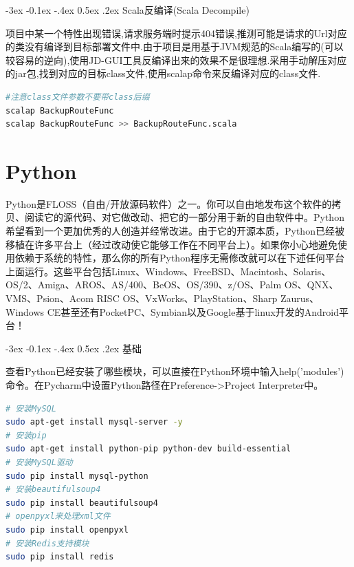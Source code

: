 \documentclass[12pt]{book}
\makeatletter
\numberwithin{dummy}{section}
\theoremstyle{ocrenumbox}
\theoremstyle{blacknumex}
\theoremstyle{blacknumbox}
\theoremstyle{ocrenum}
\renewcommand{\subsection}{\@startsection {subsection}{2}{\z@}
	{-3ex \@plus -0.1ex \@minus -.4ex}
	{0.5ex \@plus.2ex }
	{\normalfont\sffamily\bfseries}}
\makeatother
\begin{document}
\subsection{Scala反编译(Scala Decompile)}

项目中某一个特性出现错误,请求服务端时提示404错误,推测可能是请求的Url对应的类没有编译到目标部署文件中.由于项目是用基于JVM规范的Scala编写的(可以较容易的逆向),使用JD-GUI工具反编译出来的效果不是很理想.采用手动解压对应的jar包,找到对应的目标class文件,使用scalap命令来反编译对应的class文件.

\begin{lstlisting}[language=Bash]
#注意class文件参数不要带class后缀
scalap BackupRouteFunc
scalap BackupRouteFunc >> BackupRouteFunc.scala
\end{lstlisting}


\chapter{Python}

Python是FLOSS（自由/开放源码软件）之一。你可以自由地发布这个软件的拷贝、阅读它的源代码、对它做改动、把它的一部分用于新的自由软件中。Python希望看到一个更加优秀的人创造并经常改进。由于它的开源本质，Python已经被移植在许多平台上（经过改动使它能够工作在不同平台上）。如果你小心地避免使用依赖于系统的特性，那么你的所有Python程序无需修改就可以在下述任何平台上面运行。这些平台包括Linux、Windows、FreeBSD、Macintosh、Solaris、OS/2、Amiga、AROS、AS/400、BeOS、OS/390、z/OS、Palm OS、QNX、VMS、Psion、Acom RISC OS、VxWorks、PlayStation、Sharp Zaurus、Windows CE甚至还有PocketPC、Symbian以及Google基于linux开发的Android平台！

\subsection{基础}

查看Python已经安装了哪些模块，可以直接在Python环境中输入help('modules')命令。在Pycharm中设置Python路径在Preference->Project Interpreter中。

\begin{lstlisting}[language=Bash]
# 安装MySQL
sudo apt-get install mysql-server -y
# 安装pip
sudo apt-get install python-pip python-dev build-essential
# 安装MySQL驱动
sudo pip install mysql-python
# 安装beautifulsoup4
sudo pip install beautifulsoup4
# openpyxl来处理xml文件
sudo pip install openpyxl
# 安装Redis支持模块
sudo pip install redis
\end{lstlisting}
\end{document}

